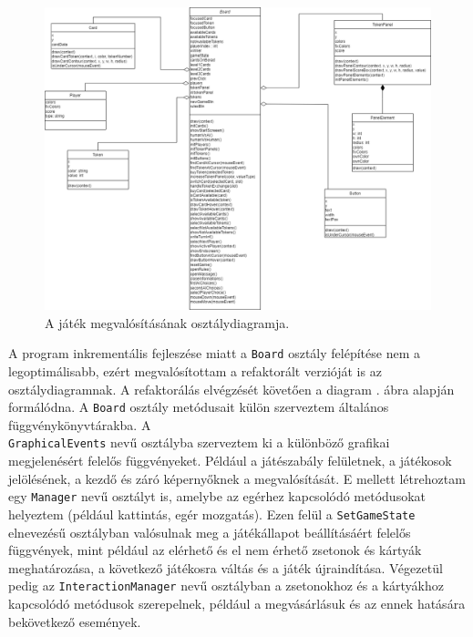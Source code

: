 \begin{figure}[h!]
\centering
\includegraphics[width=\textwidth]{images/UML.png}
\caption{A játék megvalósításának osztálydiagramja.}
\label{fig:uml}
\end{figure}

A program inkrementális fejleszése miatt a \texttt{Board} osztály felépítése nem a legoptimálisabb, ezért megvalósítottam a refaktorált verzióját is az osztálydiagramnak. A refaktorálás elvégzését követően a diagram . ábra alapján formálódna. A \texttt{Board} osztály metódusait külön szerveztem általános függvénykönyvtárakba. A \\ \texttt{GraphicalEvents} nevű osztályba szerveztem ki a különböző grafikai megjelenésért felelős függvényeket. Például a játészabály felületnek, a játékosok jelölésének, a kezdő és záró képernyőknek a megvalósítását. E mellett létrehoztam egy \texttt{Manager} nevű osztályt is, amelybe az egérhez kapcsolódó metódusokat helyeztem (például kattintás, egér mozgatás). Ezen felül a \texttt{SetGameState} elnevezésű osztályban valósulnak meg a játékállapot beállításáért felelős függvények, mint például az elérhető és el nem érhető zsetonok és kártyák meghatározása, a következő játékosra váltás és a játék újraindítása. Végezetül pedig az \texttt{InteractionManager} nevű osztályban a zsetonokhoz és a kártyákhoz kapcsolódó metódusok szerepelnek, például a megvásárlásuk és az ennek hatására bekövetkező események.

